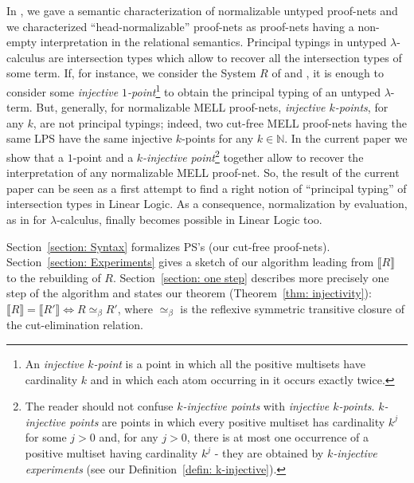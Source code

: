\documentclass{article}
\theoremstyle{plain}
\newcommand{\Nat}{\ensuremath{\mathbb{N}}}
\newcommand{\sm}[1]{\llbracket #1 \rrbracket}
\begin{document}
In \cite{CarvPagTdF10}, we gave a semantic characterization of normalizable untyped proof-nets and we characterized ``head-normalizable'' proof-nets as proof-nets having a non-empty interpretation in the relational semantics. Principal typings in untyped $\lambda$-calculus are intersection types which allow to recover all the intersection types of some term. If, for instance, we consider the System $R$ of \cite{phddecarvalho} and \cite{Carvalhoexecution}, it is enough to consider some \emph{injective $1$-point}\footnote{An \emph{injective $k$-point} is a point in which all the positive multisets have cardinality $k$ and in which each atom occurring in it occurs exactly twice.} to obtain the principal typing of an untyped $\lambda$-term. But, generally, for normalizable MELL proof-nets, \emph{injective $k$-points}, for any $k$, are not principal typings; indeed, two cut-free MELL proof-nets having the same LPS have the same injective $k$-points for any $k \in \Nat$. In the current paper we show that a $1$-point and a \emph{$k$-injective point}\footnote{The reader should not confuse \emph{$k$-injective points} with \emph{injective $k$-points}. \emph{$k$-injective points} are points in which every positive multiset has cardinality $k^j$ for some $j> 0$ and, for any $j > 0$, there is at most one occurrence of a positive multiset having cardinality $k^j$ - they are obtained by \emph{$k$-injective experiments} (see our Definition~\ref{defin: k-injective}).} together allow to recover the interpretation of any normalizable MELL proof-net. So, the result of the current paper can be seen as a first attempt to find a right notion of ``principal typing'' of intersection types in Linear Logic. As a consequence, normalization by evaluation, as in \cite{Rocca88} for $\lambda$-calculus, finally becomes possible in Linear Logic too.

Section~\ref{section: Syntax} formalizes PS's (our cut-free proof-nets). Section~\ref{section: Experiments} gives a sketch of our algorithm leading from $\sm{R}$ to the rebuilding of $R$. Section~\ref{section: one step} describes more precisely one step of the algorithm and states our theorem (Theorem~\ref{thm: injectivity}): 
$\llbracket R \rrbracket = \llbracket R' \rrbracket \Leftrightarrow R \simeq_\beta R'$, 
where $\simeq_\beta$ is the reflexive symmetric transitive closure of the cut-elimination relation.
 
\end{document}
